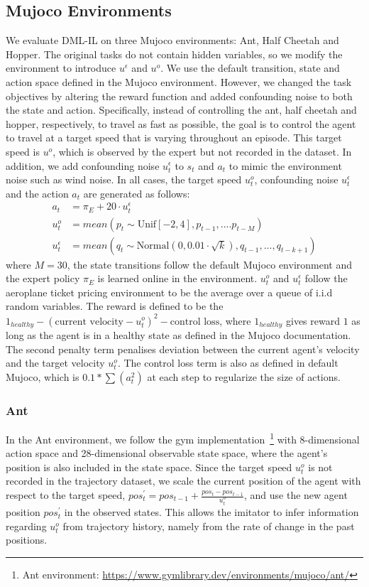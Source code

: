 \subsection{Mujoco Environments}\label{appendix:mujoco}
We evaluate DML-IL on three Mujoco environments: Ant, Half Cheetah and Hopper. The original tasks do not contain hidden variables, so we modify the environment to introduce $u^\epsilon$ and $u^o$. We use the default transition, state and action space defined in the Mujoco environment. However, we changed the task objectives by altering the reward function and added confounding noise to both the state and action. Specifically, instead of controlling the ant, half cheetah and hopper, respectively, to travel as fast as possible, the goal is to control the agent to travel at a target speed that is varying throughout an episode. This target speed is $u^o$, which is observed by the expert but not recorded in the dataset. In addition, we add confounding noise $u^\epsilon_t$ to $s_t$ and $a_t$ to mimic the environment noise such as wind noise. In all cases, the target speed $u^o_t$, confounding noise $u^\epsilon_t$ and the action $a_t$ are generated as follows:
\begin{align}
a_t&=\pi_E+20\cdot u^\epsilon_t\\
u^o_t&=mean(p_t\sim \text{Unif} [-2,4],p_{t-1},....p_{t-M})\\
u^\epsilon_t&=mean(q_t\sim \text{Normal}(0,0.01\cdot\sqrt{k}),q_{t-1},...,q_{t-k+1})
\end{align}
where $M=30$, the state transitions follow the default Mujoco environment and the expert policy $\pi_E$ is learned online in the environment. $u^o_t$ and $u^\epsilon_t$ follow the aeroplane ticket pricing environment to be the average over a queue of i.i.d random variables. The reward is defined to be the $1_{healthy}-(\text{current velocity}-u^o_t)^2-\text{control loss}$, where $1_{healthy}$ gives reward $1$ as long as the agent is in a healthy state as defined in the Mujoco documentation. The second penalty term penalises deviation between the current agent's velocity and the target velocity $u^o_t$. The control loss term is also as defined in default Mujoco, which is $0.1*\sum(a_t^2)$ at each step to regularize the size of actions.
\subsubsection{Ant}

In the Ant environment, we follow the gym implementation~\footnote{Ant environment: \url{https://www.gymlibrary.dev/environments/mujoco/ant/}} with 8-dimensional action space and 28-dimensional observable state space, where the agent's position is also included in the state space. Since the target speed $u^o_t$ is not recorded in the trajectory dataset, we scale the current position of the agent with respect to the target speed, $pos_t^\prime= pos_{t-1}+\frac{pos_t-pos_{t-1}}{u^o_t}$, and use the new agent position $pos_t^\prime$ in the observed states. This allows the imitator to infer information regarding $u^o_t$ from trajectory history, namely from the rate of change in the past positions.


